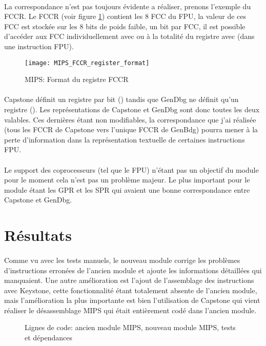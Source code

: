 \documentclass[11pt, book, english, french, standardlists]{upmethodology-document}
\begin{document}
			\paragraph*{}
				La correspondance n'est pas toujours évidente a réaliser, prenons l'exemple du \gls{FCCR}. Le \gls{FCCR} (voir figure \ref{fig:MIPS_FCCR_register_format}) contient les 8 \gls{FCC} du \gls{FPU}, la valeur de ces \gls{FCC} est stockée sur les 8 bits de poids faible, un bit par \gls{FCC}, il est possible d'accéder aux \gls{FCC} individuellement avec  ou à la totalité du registre avec  (dans une instruction \gls{FPU}).
			\begin{figure}[H]
				\centering%
				\texttt{[image: MIPS\_FCCR\_register\_format]}
				\caption{\acrshort{MIPS}: Format du registre \acrshort{FCCR}}%
				\label{fig:MIPS_FCCR_register_format}%
			\end{figure}
			\paragraph*{}
				Capstone définit un registre par bit () tandis que GenDbg ne définit qu'un registre (). Les représentations de Capstone et GenDbg sont donc toutes les deux valables. Ces dernières étant non modifiables, la correspondance que j'ai réalisée (tous les \gls{FCCR} de Capstone vers l'unique \gls{FCCR} de GenBdg) pourra mener à la perte d'information dans la représentation textuelle de certaines instructions \gls{FPU}.
			\paragraph*{}
				Le support des coprocesseurs (tel que le \gls{FPU}) n'étant pas un objectif du module pour le moment cela n'est pas un problème majeur. Le plus important pour le module étant les \gls{GPR} et les \gls{SPR} qui avaient une bonne correspondance entre Capstone et GenDbg.
		\section{Résultats}
			\paragraph*{}
				Comme vu avec les tests manuels, le nouveau module corrige les problèmes d'instructions erronées de l'ancien module et ajoute les informations détaillées qui manquaient. Une autre amélioration est l'ajout de l'assemblage des instructions avec Keystone, cette fonctionnalité étant totalement absente de l'ancien module, mais l'amélioration la plus importante est bien l'utilisation de Capstone qui vient réaliser le désassemblage MIPS qui était entièrement codé dans l'ancien module.
			\begin{figure}[H]
				\centering%
				\caption{Lignes de code: ancien module MIPS, nouveau module MIPS, tests et dépendances}%
				\label{fig:Lignes_code_module_MIPS}%
			\end{figure}
\end{document}
